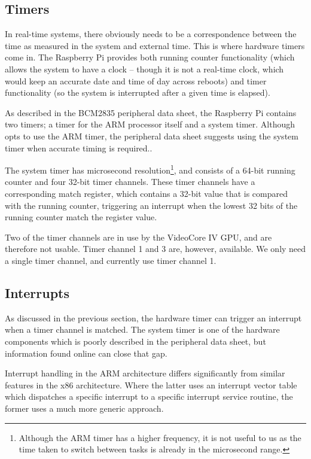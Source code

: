 \documentclass[twoside]{uva-inf-bachelor-thesis}
\begin{document}
\subsection{Timers}
In real-time systems, there obviously needs to be a correspondence between the time as measured in the system and external time. This is where hardware timers come in. The Raspberry Pi provides both running counter functionality (which allows the system to have a clock -- though it is not a real-time clock, which would keep an accurate date and time of day across reboots) and timer functionality (so the system is interrupted after a given time is elapsed).

As described in the BCM2835 peripheral data sheet, the Raspberry Pi contains two timers; a timer for the ARM processor itself and a system timer. Although \textcite{sfd:realpi} opts to use the ARM timer, the peripheral data sheet suggests using the system timer when accurate timing is required.\cite[p. 196]{bcm:2835peripherals}.

The system timer has microsecond resolution\footnote{Although the ARM timer has a higher frequency, it is not useful to us as the time taken to switch between tasks is already in the microsecond range.}, and consists of a 64-bit running counter and four 32-bit timer channels. These timer channels have a corresponding match register, which contains a 32-bit value that is compared with the running counter, triggering an interrupt when the lowest 32 bits of the running counter match the register value.

Two of the timer channels are in use by the VideoCore IV GPU, and are therefore not usable. Timer channel 1 and 3 are, however, available. We only need a single timer channel, and currently use timer channel 1.

\subsection{Interrupts}
As discussed in the previous section, the hardware timer can trigger an interrupt when a timer channel is matched. The system timer is one of the hardware components which is poorly described in the peripheral data sheet, but information found online can close that gap.

Interrupt handling in the ARM architecture differs significantly from similar features in the x86 architecture. Where the latter uses an interrupt vector table which dispatches a specific interrupt to a specific interrupt service routine, the former uses a much more generic approach.
\end{document}
